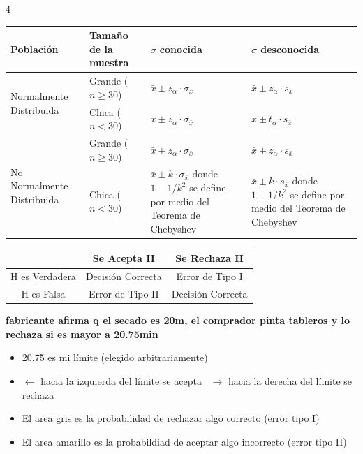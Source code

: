 \documentclass[10pt,a4paper,landscape]{article}
\renewcommand{\arraystretch}{1.12}
\newcommand{\chico}{\fontsize{4.2}{4.6}\selectfont}
\newcommand{\sub}[1]{\par\vspace{0.8pt}{\fontsize{5.3}{6.1}\selectfont\bfseries #1}\par\vspace{0.4pt}}
\newenvironment{lista}{\begin{itemize}[leftmargin=7pt,itemsep=0pt,topsep=0.5pt,parsep=0pt,labelsep=2pt]}{\end{itemize}}
\begin{document}
\begin{multicols}{4}
\sub{Eleccion estadistico}
\begin{center}
{\chico
\renewcommand{\arraystretch}{1.0}
\begin{tabular}{|p{6.2em}|p{4.6em}|p{9.5em}|p{9.5em}|}
\hline
Población & Tamaño de la muestra & $\sigma$ conocida & $\sigma$ desconocida \\
\hline
\multirow{2}{=}{Normalmente Distribuida}
  & Grande ($n \geq 30$) & \centering $\bar{x} \pm z_\alpha \cdot \sigma_{\bar{x}}$ & \centering\arraybackslash $\bar{x} \pm z_\alpha \cdot s_{\bar{x}}$ \\
\cline{2-4}
  & Chica ($n < 30$) & \centering $\bar{x} \pm z_\alpha \cdot \sigma_{\bar{x}}$ & \centering\arraybackslash $\bar{x} \pm t_\alpha \cdot s_{\bar{x}}$ \\
\hline
\multirow{2}{=}{No Normalmente Distribuida}
  & Grande ($n \geq 30$) & \centering $\bar{x} \pm z_\alpha \cdot \sigma_{\bar{x}}$ & \centering\arraybackslash $\bar{x} \pm z_\alpha \cdot s_{\bar{x}}$ \\
\cline{2-4}
  & Chica ($n < 30$) & $\bar{x} \pm k \cdot \sigma_{\bar{x}}$ \newline donde $1-1/k^2$ se define por medio del Teorema de Chebyshev
                     & $\bar{x} \pm k \cdot s_{\bar{x}}$ \newline donde $1-1/k^2$ se define por medio del Teorema de Chebyshev \\
\hline
\end{tabular}
}
\end{center}

\begin{center}
{\chico
\renewcommand{\arraystretch}{1.05}
\begin{tabular}{|c|c|c|}
\hline
 & Se Acepta H & Se Rechaza H \\
\hline
H es Verdadera & Decisión Correcta & Error de Tipo I \\
\hline
H es Falsa & Error de Tipo II & Decisión Correcta \\
\hline
\end{tabular}
}
\end{center}

\textbf{fabricante afirma q el secado es 20m, el comprador pinta tableros y lo rechaza si es mayor a 20.75min}

\begin{lista}
  \item 20,75 es mi límite (elegido arbitrariamente)
  \item $\leftarrow$ hacia la izquierda del límite se acepta \ $\rightarrow$ hacia la derecha del límite se rechaza
  \item El area gris es la probabilidad de rechazar algo correcto (error tipo I)
  \item El area amarillo es la probabildiad de aceptar algo incorrecto (error tipo II)
\end{lista}


\end{multicols}
\end{document}
